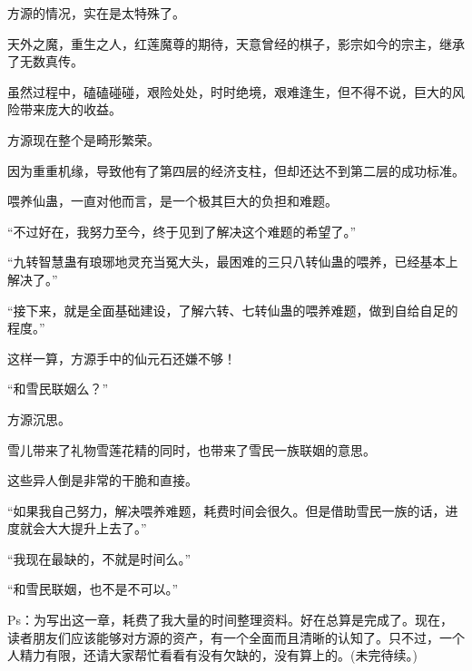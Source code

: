 \begin{this_body}
方源的情况，实在是太特殊了。

天外之魔，重生之人，红莲魔尊的期待，天意曾经的棋子，影宗如今的宗主，继承了无数真传。

虽然过程中，磕磕碰碰，艰险处处，时时绝境，艰难逢生，但不得不说，巨大的风险带来庞大的收益。

方源现在整个是畸形繁荣。

因为重重机缘，导致他有了第四层的经济支柱，但却还达不到第二层的成功标准。

喂养仙蛊，一直对他而言，是一个极其巨大的负担和难题。

“不过好在，我努力至今，终于见到了解决这个难题的希望了。”

“九转智慧蛊有琅琊地灵充当冤大头，最困难的三只八转仙蛊的喂养，已经基本上解决了。”

“接下来，就是全面基础建设，了解六转、七转仙蛊的喂养难题，做到自给自足的程度。”

这样一算，方源手中的仙元石还嫌不够！

“和雪民联姻么？”

方源沉思。

雪儿带来了礼物雪莲花精的同时，也带来了雪民一族联姻的意思。

这些异人倒是非常的干脆和直接。

“如果我自己努力，解决喂养难题，耗费时间会很久。但是借助雪民一族的话，进度就会大大提升上去了。”

“我现在最缺的，不就是时间么。”

“和雪民联姻，也不是不可以。”

Ps：为写出这一章，耗费了我大量的时间整理资料。好在总算是完成了。现在，读者朋友们应该能够对方源的资产，有一个全面而且清晰的认知了。只不过，一个人精力有限，还请大家帮忙看看有没有欠缺的，没有算上的。(未完待续。)

\end{this_body}

